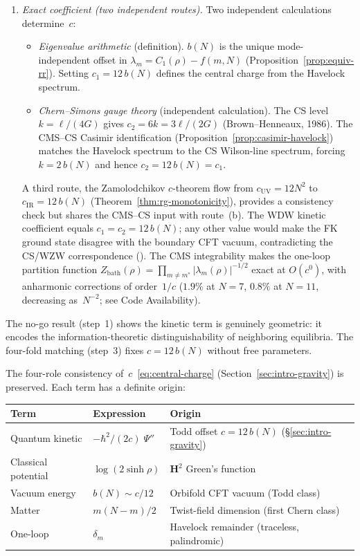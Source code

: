 \begin{enumerate}
\item \emph{Exact coefficient (two independent routes).}
  Two independent calculations determine~$c$:
  \begin{itemize}
  \item[\emph{(a)}] \emph{Eigenvalue arithmetic} (definition).
    $b(N)$ is the unique mode-independent offset in
    $\lambda_m = C_1(\rho) - f(m,N)$
    (Proposition~\ref{prop:equiv-rr}).
    Setting $c_1 = 12\,b(N)$ defines the
    central charge from the Havelock spectrum.
  \item[\emph{(b)}] \emph{Chern--Simons gauge theory}
    (independent calculation).
    The CS level $k = \ell/(4G)$ gives
    $c_2 = 6k = 3\ell/(2G)$
    (Brown--Henneaux, 1986).
    The CMS--CS Casimir identification
    (Proposition~\ref{prop:casimir-havelock})
    matches the Havelock spectrum to the CS
    Wilson-line spectrum, forcing $k = 2\,b(N)$
    and hence $c_2 = 12\,b(N) = c_1$.
  \end{itemize}
  A third route, the Zamolodchikov $c$-theorem
  flow from $c_{\mathrm{UV}} = 12N^2$ to
  $c_{\mathrm{IR}} = 12\,b(N)$
  (Theorem~\ref{thm:rg-monotonicity}), provides
  a consistency check but shares the CMS--CS
  input with route~(b).
  The WDW kinetic coefficient equals
  $c_1 = c_2 = 12\,b(N)$; any other value
  would make the FK ground state disagree with
  the boundary CFT vacuum, contradicting the
  CS/WZW correspondence (\citealt{Witten1988}).
  The CMS integrability makes the one-loop partition function
  $Z_{\mathrm{bath}}(\rho) = \prod_{m \ne m^*}|\lambda_m(\rho)|^{-1/2}$
  exact at $O(c^0)$,
  with anharmonic corrections of order~$1/c$
  ($1.9\%$ at $N = 7$, $0.8\%$ at $N = 11$, decreasing as~$N^{-2}$;
  see Code Availability).
\end{enumerate}
The no-go result (step~1) shows the kinetic term is genuinely
geometric: it encodes the information-theoretic
distinguishability of neighboring equilibria.
The four-fold matching (step~3) fixes $c = 12\,b(N)$ without
free parameters.

The four-role consistency of~$c$~\eqref{eq:central-charge} (Section~\ref{sec:intro-gravity}) is preserved.
Each term has a definite origin:
\begin{center}
\small
\begin{tabular}{lll}
\toprule
Term & Expression & Origin \\
\midrule
Quantum kinetic & $-\hbar^2/(2c)\;\Psi''$ &
  Todd offset $c = 12\,b(N)$ (\S\ref{sec:intro-gravity}) \\
Classical potential & $\log(2\sinh\rho)$ &
  $\mathbf{H}^2$ Green's function \\
Vacuum energy & $b(N) \sim c/12$ &
  Orbifold CFT vacuum (Todd class) \\
Matter & $m(N{-}m)/2$ &
  Twist-field dimension (first Chern class) \\
One-loop & $\delta_m$ &
  Havelock remainder (traceless, palindromic) \\
\bottomrule
\end{tabular}
\end{center}

